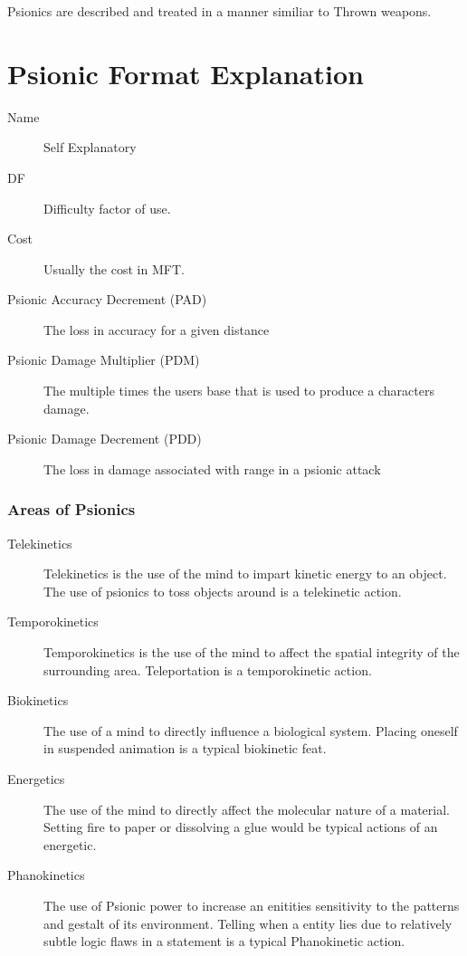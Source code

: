 Psionics are described and treated in a manner similiar to Thrown weapons.

\section{Psionic For\-mat Ex\-pla\-nation}

\begin{description}
	\item[Name]
	Self Explanatory
    \item[DF]
    Difficulty factor of use.
	\item[Cost]
	Usually the cost in MFT.
	\item[Psionic Accuracy Decrement (PAD)]
	The loss in accuracy for a given distance
	\item[Psionic Damage Multiplier (PDM)]
	The multiple times the users base that is used to produce a characters
	damage.
	\item[Psionic Damage Decrement (PDD)]
	The loss in dam\-age as\-so\-ciated with range in a psionic attack
\end{description}

\subsubsection{Areas of Psionics}

\begin{description}
	\item[Telekinetics]
	Telekinetics is the use of the mind to impart kinetic energy to an
	object. The use of psionics to toss objects around is a telekinetic 
	action.
	\item[Temporokinetics]
	Temporokinetics is the use of the mind to affect the spatial integrity
	of the surrounding area. Teleportation is a temporokinetic action.
	\item[Biokinetics]
	The use of a mind to directly influence a biological system. Placing 
	oneself in suspended animation is a typical biokinetic feat.
	\item[Energetics]
	The use of the mind to directly affect the molecular nature of a
	material. Setting fire to paper or dissolving a glue would be 
	typical actions of an energetic.
	\item[Phanokinetics]
	The use of Psionic power to increase an enitities sensitivity to the 
	patterns and gestalt of its environment. Telling when a entity lies 
	due to relatively subtle logic flaws in a statement is a typical 
	Phanokinetic action.
\end{description}



